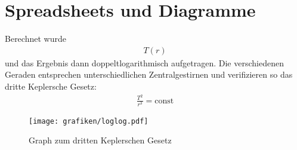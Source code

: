 \section{Spreadsheets und Diagramme}
Berechnet wurde
\begin{align*}
    T(r)
    \label{eqn:umlauf}
\end{align*}
und das Ergebnis dann doppeltlogarithmisch aufgetragen. Die verschiedenen
Geraden entsprechen unterschiedlichen Zentralgestirnen und verifizieren so das
dritte Keplersche Gesetz:
\begin{align*}
    \frac{T^2}{r^3} = \mathrm{const}
\end{align*}

\begin{figure}[h!]
  \begin{center}
    \texttt{[image: grafiken/loglog.pdf]}
  \end{center}
  \caption{Graph zum dritten Keplerschen Gesetz}
  \label{fig:loglog}
\end{figure}

